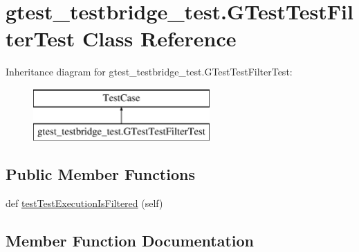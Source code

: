 \hypertarget{classgtest__testbridge__test_1_1_g_test_test_filter_test}{}\section{gtest\+\_\+testbridge\+\_\+test.\+G\+Test\+Test\+Filter\+Test Class Reference}
\label{classgtest__testbridge__test_1_1_g_test_test_filter_test}
Inheritance diagram for gtest\+\_\+testbridge\+\_\+test.\+G\+Test\+Test\+Filter\+Test\+:\begin{figure}[H]
\begin{center}
\leavevmode
\includegraphics[height=2.000000cm]{classgtest__testbridge__test_1_1_g_test_test_filter_test}
\end{center}
\end{figure}
\subsection*{Public Member Functions}
\begin{DoxyCompactItemize}
\item 
def \mbox{\hyperlink{classgtest__testbridge__test_1_1_g_test_test_filter_test_af41ae1fea4ec08f5594ad1ae78663d3c}{test\+Test\+Execution\+Is\+Filtered}} (self)
\end{DoxyCompactItemize}


\subsection{Member Function Documentation}
\mbox{\label{classgtest__testbridge__test_1_1_g_test_test_filter_test_af41ae1fea4ec08f5594ad1ae78663d3c}} 
